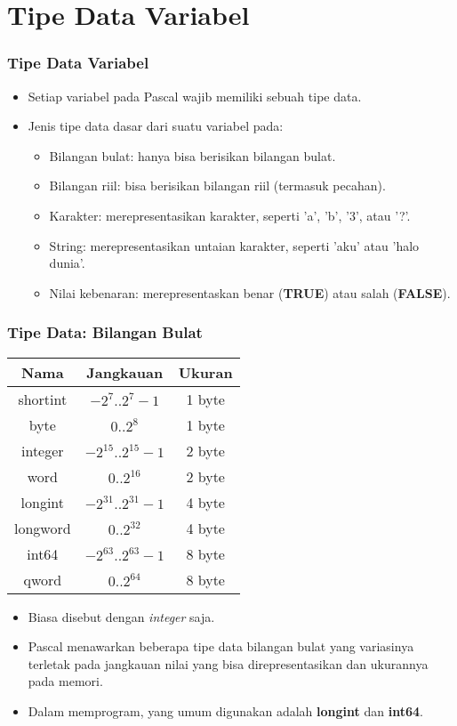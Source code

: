 \section{Tipe Data Variabel}
\frame{\sectionpage}

\begin{frame}
\frametitle{Tipe Data Variabel}
\begin{itemize}
  \item Setiap variabel pada Pascal wajib memiliki sebuah \alert{tipe data}.
  \item Jenis tipe data dasar dari suatu variabel pada:
  \begin{itemize}
    \item Bilangan bulat: hanya bisa berisikan bilangan bulat.
    \item Bilangan riil: bisa berisikan bilangan riil (termasuk pecahan).
    \item Karakter: merepresentasikan karakter, seperti 'a', 'b', '3', atau '?'.
    \item String: merepresentasikan untaian karakter, seperti 'aku' atau 'halo dunia'.
    \item Nilai kebenaran: merepresentaskan benar (\textbf{TRUE}) atau salah (\textbf{FALSE}).
  \end{itemize}
\end{itemize}
\end{frame}

\begin{frame}
\frametitle{Tipe Data: Bilangan Bulat}
\begin{table}[ht]
  \begin{tabular}{|c|c|c|}
    \hline Nama  & Jangkauan  & Ukuran \\
    \hline shortint & $-2^7 .. 2^7-1$ & 1 byte \\
    \hline byte & $0 .. 2^8$ & 1 byte\\
    \hline integer & $-2^{15} .. 2^{15}-1$ & 2 byte\\
    \hline word & $0 .. 2^{16}$ & 2 byte\\
    \hline longint & $-2^{31} .. 2^{31}-1$ & 4 byte\\
    \hline longword & $0 .. 2^{32}$ & 4 byte\\
    \hline int64 & $-2^{63} .. 2^{63}-1$ & 8 byte\\
    \hline qword & $0 .. 2^{64}$ & 8 byte\\
    \hline
  \end{tabular}
\end{table}
\begin{itemize}
  \item Biasa disebut dengan \textit{integer} saja.
  \item Pascal menawarkan beberapa tipe data bilangan bulat yang variasinya terletak pada jangkauan nilai yang bisa direpresentasikan dan ukurannya pada memori.
  \item Dalam memprogram, yang umum digunakan adalah \alert{\textbf{longint}} dan \alert{\textbf{int64}}.
\end{itemize}
\end{frame}

